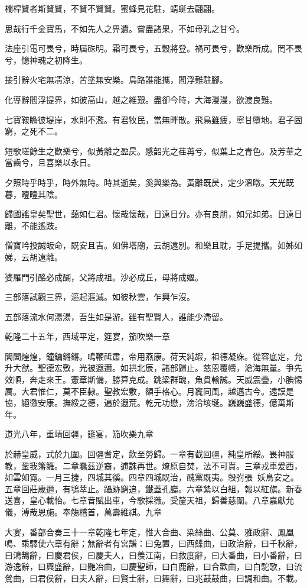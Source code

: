 \begin{pinyinscope}
欄桿賢者斯賢賢，不賢不賢賢。蜜蜂見花駐，蜻蜒去翩翩。

思哉行千金寶馬，不如先人之畀遺。嘗盡諸果，不如母乳之甘兮。

法座引電可畏兮，時屆硃明。霜可畏兮，五穀將登。禍可畏兮，歡樂所成。罔不畏兮，憶神魂之初降生。

接引辭火宅無凊涼，苦塗無安樂。鳥路誰能攜，閻浮難駐腳。

化導辭閻浮提界，如彼高山，越之維艱。盡卻今時，大海漫漫，欲渡良難。

七寶鞍瞻彼堤岸，水則不濫。有君牧民，當無畔散。飛鳥雖疲，寧甘墮地。君子固窮，之死不二。

短歌嗟餘生之歡樂兮，似黃離之盈昃。感韶光之荏苒兮，似葉上之青色。及芳華之當齒兮，且喜樂以永日。

夕照時乎時乎，時外無時。時其逝矣，奚與樂為。黃離既昃，定少溫暾。天光既暮，曀曀其陰。

歸國謠皇矣聖世，藹如仁君。懷哉懷哉，日遠日分。亦有良朋，如兄如弟。日遠日離，不能遙跂。

僧寶吟投誠皈命，既安且吉。如佛塔廟，云胡遠別。和樂且耽，手足提攜。如姊如娣，云胡遠離。

婆羅門引酪必成醐，父將成祖。沙必成丘，母將成嫗。

三部落試觀三界，漚起漚滅。如彼秋雲，乍興乍沒。

五部落流水何湯湯，吾生如是游。雖有聖賢人，誰能少滯留。

乾隆二十五年，西域平定，筵宴，笳吹樂一章

閶闔煌煌，鐘鏞鏘鏘。鳴鞭祗肅，帝用燕康。荷天純嘏，祖德凝庥。從容底定，允升大猷。聖德宏敷，光被遐邇。如拱北辰，諸部歸止。慈恩覆幬，滄海無量。爭先效順，奔走來王。憲章斯備，勝算克成。跳梁群醜，魚貫輸誠。天威震疊，小腆惕厲。大君惟仁，莫不臣隸。聖教宏敷，額手格心。月竁同風，越邁古今。遠謨是協，絕徼安康。撫綏之德，遍於遐荒。乾元功懋，滂洽垓埏。巍巍盛德，億萬斯年。

道光八年，重靖回疆，筵宴，笳吹樂九章

於赫皇威，式於九圍。回疆耆定，飲至勞歸。一章有截回疆，純皇所綏。畏神服教，鞏我籓籬。二章蠢茲逆裔，逋誅再世。燎原自焚，法不可貰。三章戎車爰西，如雲如霓。一月三捷，四城其徯。四章四城既治，醜黨既夷。彀弣張，妖鳥安之。五章回莊歲邇，有鴞萃止。躡跡窮追，鐵蓋孔巋。六章縶以白組，報以紅旗。新春送喜，皇心載怡。七章昔賦出車，今歌採薇。受釐天祖，歸善慈闈。八章嘉獻允儀，溥哉恩施。奉觴稽首，萬壽維祺。九章

大宴，番部合奏三十一章乾隆七年定，惟大合曲、染絲曲、公莫、雅政辭、鳳凰鳴、乘驛使六章有辭；無辭者有宮譜：曰兔置，曰西鰈曲，曰政治辭，曰千秋辭，曰鴻鵠辭，曰慶君侯，曰慶夫人，曰羨江南，曰救度辭，曰大番曲，曰小番辭，曰游逸辭，曰興盛辭，曰艷冶曲，曰慶聖師，曰白鹿辭，曰合歡曲，曰白駝歌，曰流鶯曲，曰君侯辭，曰夫人辭，曰賢士辭，曰舞辭，曰兆鼓鼓曲，曰調和曲。不載。


\end{pinyinscope}
